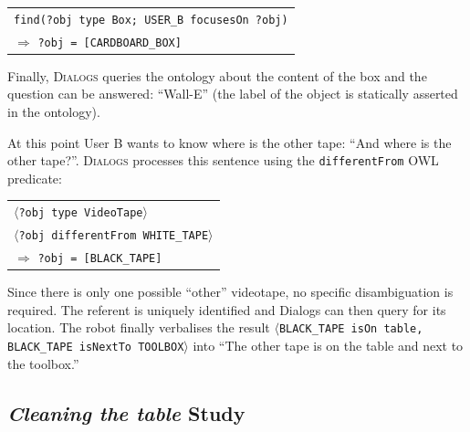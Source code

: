 \documentclass[preprint,3p,times]{elsarticle}
\newcommand{\concept}[1]{{\small \texttt{#1}}}
\newcommand{\stmt}[1]{{\footnotesize\tt$\langle$#1\relax$\rangle$}}
\begin{document}
\begin{center} 
    \begin{tabular}{l} 
        \concept{find(?obj type Box; USER\_B focusesOn ?obj)}\\ 
        \hspace{0.7cm}$\Rightarrow$ {\tt ?obj = [CARDBOARD\_BOX]}
    \end{tabular} 
\end{center}

Finally, \textsc{Dialogs} queries the ontology about the content of the box and
the question can be answered: ``Wall-E'' (the label of the object is statically
asserted in the ontology).


At this point User B wants to know where is the other tape: ``And where is the
other tape?''. \textsc{Dialogs} processes this sentence using the
\concept{differentFrom} OWL predicate:

\begin{center}
\begin{tabular}{l}
\stmt{?obj type VideoTape}\\
\stmt{?obj differentFrom WHITE\_TAPE}\\
\hspace{0.7cm}$\Rightarrow$ \concept{?obj = [BLACK\_TAPE]}
\end{tabular}
\end{center}

Since there is only one possible ``other'' videotape, no specific
disambiguation is required. The referent is uniquely identified and {\sc
Dialogs} can then query for its location. The robot finally verbalises the
result \stmt{BLACK\_TAPE isOn table, BLACK\_TAPE isNextTo TOOLBOX} into ``The
other tape is on the table and next to the toolbox.''

\subsection{\emph{Cleaning the table} Study}
\label{sec:cleantable}
\end{document}
